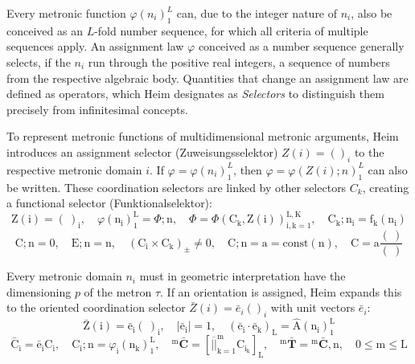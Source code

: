 \documentclass[12pt]{article}
\begin{document}
Every metronic function \( \varphi(n_i)_1^L \) can, due to the integer nature of \( n_i \), also be conceived as an \( L \)-fold number sequence, for which all criteria of multiple sequences apply. An assignment law \( \varphi \) conceived as a number sequence generally selects, if the \( n_i \) run through the positive real integers, a sequence of numbers from the respective algebraic body. Quantities that change an assignment law are defined as operators, which Heim designates as \textit{Selectors} to distinguish them precisely from infinitesimal concepts. 

To represent metronic functions of multidimensional metronic arguments, Heim introduces an assignment selector (Zuweisungsselektor) \( Z(i) = ()_i \) to the respective metronic domain \( i \). If \( \varphi = \varphi(n_i)_1^L \), then \( \varphi = \varphi(Z(i); n)_1^L \) can also be written. These coordination selectors are linked by other selectors \( C_k \), creating a functional selector (Funktionalselektor):
\begin{equation}
\mathrm{Z(i)} = (\ )_\mathrm{i}, \quad \varphi(\mathrm{n_i})_1^\mathrm{L} = \Phi;\mathrm{n}, \quad \Phi = \Phi(\mathrm{C_k}, \mathrm{Z(i)})_{\mathrm{i,k=1}}^{\mathrm{L,K}}, \quad \mathrm{C_k};\mathrm{n_i} = \mathrm{f_k}(\mathrm{n_i}) \tag{78}
\end{equation}
\begin{equation}
\mathrm{C};\mathrm{n} = 0, \quad \mathrm{E};\mathrm{n} = \mathrm{n}, \quad (\mathrm{C_i} \times \mathrm{C_k})_\pm \neq 0, \quad \mathrm{C};\mathrm{n} = \mathrm{a} = \text{const}(\mathrm{n}), \quad \mathrm{C} = \mathrm{a} \frac{(\ )}{(\ )} \tag{78a}
\end{equation}

Every metronic domain \( n_i \) must in geometric interpretation have the dimensioning \( p \) of the metron \( \tau \). If an orientation is assigned, Heim expands this to the oriented coordination selector \( \bar{Z}(i) = \bar{e}_i ()_i \) with unit vectors \( \bar{e}_i \):
\begin{equation}
\bar{\mathrm{Z}}(\mathrm{i}) = \bar{\mathrm{e}}_\mathrm{i} (\ )_\mathrm{i}, \quad |\bar{\mathrm{e}}_\mathrm{i}| = 1, \quad (\bar{\mathrm{e}}_\mathrm{i} \cdot \bar{\mathrm{e}}_\mathrm{k})_\mathrm{L} = \hat{\mathrm{A}}(\mathrm{n_i})_1^\mathrm{L} \tag{78b}
\end{equation}
\begin{equation}
\bar{\mathrm{C}}_\mathrm{i} = \bar{\mathrm{e}}_\mathrm{i} \mathrm{C_i}, \quad \mathrm{C_i};\mathrm{n} = \varphi_\mathrm{i}(\mathrm{n_k})_1^\mathrm{L}, \quad {}^\mathrm{m}\bar{\mathbf{C}} = \left[ \overline{||}_{\mathrm{k}=1}^\mathrm{m} \mathrm{C}_{\mathrm{i_k}} \right]_\mathrm{L}, \quad {}^\mathrm{m}\bar{\mathbf{T}} = {}^\mathrm{m}\bar{\mathbf{C}}, \mathrm{n}, \quad 0 \le \mathrm{m} \le \mathrm{L} \tag{78c}
\end{equation}
\end{document}
